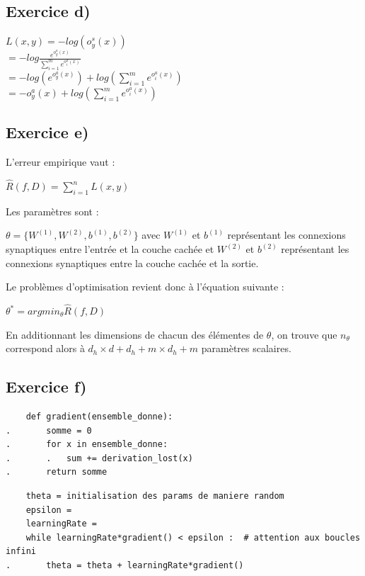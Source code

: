\documentclass[a4paper,10pt]{article}
\begin{document}
\subsection{Exercice d)}

$ L(x,y) = -log  (o^{s}_{y}(x)) $
\\[6pt]
$= -log \frac{e^{o^{a}_{y}(x)}}{\sum_{i=1}^{m} e^{o^{a}_{i}(x)}}$ 
\\[6pt]
$= -log(e^{o^{a}_{y}(x)}) +log(\sum_{i=1}^{m} e^{o^{a}_{i}(x)})  $
\\[6pt]
$ = -o^{a}_{y}(x) + log(\sum_{i=1}^{m} e^{o^{a}_{i}(x)})$

\subsection{Exercice e)} 

L'erreur empirique vaut :

$\widehat{R}(f,D) = \sum_{i=1}^{n} L(x,y)$


Les paramètres sont :

$ \theta = \{ W^{(1)},W^{(2)},b^{(1)},b^{(2)} \}$ avec $W^{(1)}$ et $b^{(1)}$ représentant les connexions synaptiques entre l'entrée et la couche cachée et $W^{(2)}$ et $b^{(2)}$ représentant les connexions synaptiques entre la couche cachée et la sortie.

Le problèmes d'optimisation revient donc à l'équation suivante :

$\theta^{*} = argmin_{\theta} \widehat{R}(f,D) $

En additionnant les dimensions de chacun des élémentes de $\theta$, on trouve que $n_{\theta}$ correspond alors à $d_{h} \times d + d_{h} + m \times d_{h} + m$ paramètres scalaires.

\subsection{Exercice f)} 

\begin{verbatim}
	def gradient(ensemble_donne):
.		somme = 0
.		for x in ensemble_donne:
.		.	sum += derivation_lost(x)
.		return somme
\end{verbatim}

\begin{verbatim}
	theta = initialisation des params de maniere random	
	epsilon =
	learningRate =
	while learningRate*gradient() < epsilon :  # attention aux boucles infini
.		theta = theta + learningRate*gradient()
\end{verbatim}
\end{document}
